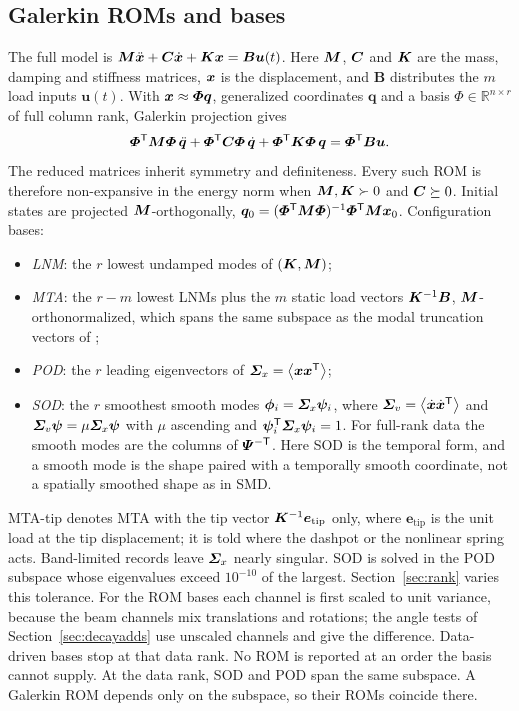 \documentclass[preprint,12pt]{elsarticle}
\begin{document}
\subsection{Galerkin ROMs and bases}
The full model is $\bm{M}\ddot{\bm{x}}+\bm{C}\dot{\bm{x}}+\bm{K}\bm{x}=\bm{B}\bm{u}(t)$. Here $\bm{M}$, $\bm{C}$ and $\bm{K}$ are the mass, damping and stiffness matrices, $\bm{x}$ is the displacement, and $\bm{B}$ distributes the $m$ load inputs $\bm{u}(t)$.
With $\bm{x}\approx\bm{\varPhi}\bm{q}$, generalized coordinates $\bm{q}$ and a basis $\bm{\varPhi}\in\mathbb{R}^{n\times r}$ of full column rank, Galerkin projection gives
\begin{equation}
\bm{\varPhi}^{\mathsf T}\bm{M}\bm{\varPhi}\,\ddot{\bm{q}}+\bm{\varPhi}^{\mathsf T}\bm{C}\bm{\varPhi}\,\dot{\bm{q}}+\bm{\varPhi}^{\mathsf T}\bm{K}\bm{\varPhi}\,\bm{q}=\bm{\varPhi}^{\mathsf T}\bm{B}\bm{u}.
\label{eq:rom}
\end{equation}
The reduced matrices inherit symmetry and definiteness. Every such ROM is therefore non-expansive in the energy norm when $\bm{M},\bm{K}\succ0$ and $\bm{C}\succeq0$.
Initial states are projected $\bm{M}$-orthogonally, $\bm{q}_0=(\bm{\varPhi}^{\mathsf T}\bm{M}\bm{\varPhi})^{-1}\bm{\varPhi}^{\mathsf T}\bm{M}\bm{x}_0$.
Configuration bases:
\begin{itemize}
\item \emph{LNM}: the $r$ lowest undamped modes of $(\bm{K},\bm{M})$;
\item \emph{MTA}: the $r-m$ lowest LNMs plus the $m$ static load vectors $\bm{K}^{-1}\bm{B}$, $\bm{M}$-orthonormalized, which spans the same subspace as the modal truncation vectors of \citet{Dickens1997};
\item \emph{POD}: the $r$ leading eigenvectors of $\bm{\varSigma}_x=\left\langle \bm{x}\bm{x}^{\mathsf T} \right\rangle$;
\item \emph{SOD}: the $r$ smoothest smooth modes $\bm{\phi}_i=\bm{\varSigma}_x\bm{\psi}_i$, where $\bm{\varSigma}_v=\left\langle \dot{\bm{x}}\dot{\bm{x}}^{\mathsf T} \right\rangle$ and $\bm{\varSigma}_v\bm{\psi}=\mu\bm{\varSigma}_x\bm{\psi}$ with $\mu$ ascending and $\bm{\psi}_i^{\mathsf T}\bm{\varSigma}_x\bm{\psi}_i=1$. For full-rank data the smooth modes are the columns of $\bm{\varPsi}^{-\mathsf T}$. Here SOD is the temporal form, and a smooth mode is the shape paired with a temporally smooth coordinate, not a spatially smoothed shape as in SMD.
\end{itemize}
MTA-tip denotes MTA with the tip vector $\bm{K}^{-1}\bm{e}_{\mathrm{tip}}$ only, where $\bm{e}_{\mathrm{tip}}$ is the unit load at the tip displacement; it is told where the dashpot or the nonlinear spring acts.
Band-limited records leave $\bm{\varSigma}_x$ nearly singular. SOD is solved in the POD subspace whose eigenvalues exceed $10^{-10}$ of the largest. Section~\ref{sec:rank} varies this tolerance. For the ROM bases each channel is first scaled to unit variance, because the beam channels mix translations and rotations; the angle tests of Section~\ref{sec:decayadds} use unscaled channels and give the difference.
Data-driven bases stop at that data rank. No ROM is reported at an order the basis cannot supply.
At the data rank, SOD and POD span the same subspace. A Galerkin ROM depends only on the subspace, so their ROMs coincide there.
\end{document}
